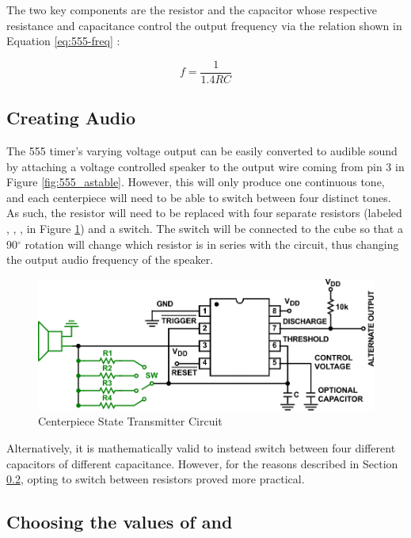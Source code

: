 The two key components are the resistor  and the capacitor
 whose respective resistance and capacitance control the output
frequency  via the relation shown in Equation \ref{eq:555-freq}
\cite{icm7555}:

\begin{equation}\label{eq:555-freq}
    f = \frac{1}{1.4 R C}
\end{equation}

\subsection{Creating Audio}

The 555 timer's varying voltage output can be easily converted to
audible sound by attaching a voltage controlled speaker to the output
wire coming from pin 3 in Figure \ref{fig:555_astable}. However, this
will only produce one continuous tone, and each centerpiece will need
to be able to switch between four distinct tones. As such, the resistor
 will need to be replaced with four separate resistors (labeled
, , ,  in Figure
\ref{fig:555_astable_modded}) and a switch. The switch will be
connected to the cube so that a 90$^\circ$ rotation will change which
resistor is in series with the circuit, thus changing the output audio
frequency of the speaker.

\begin{figure}[h]
    \centering
    \caption{Centerpiece State Transmitter Circuit}
    \label{fig:555_astable_modded}
    \includegraphics[width=\linewidth]{Figures/6 PCB Design/555_astable_modded.png}
\end{figure}

Alternatively, it is mathematically valid to instead switch between
four different capacitors of different capacitance. However, for the
reasons described in Section \ref{subsec:freq-selection}, opting to
switch between resistors proved more practical.

\subsection{Choosing the values of  and }
\label{subsec:freq-selection}

